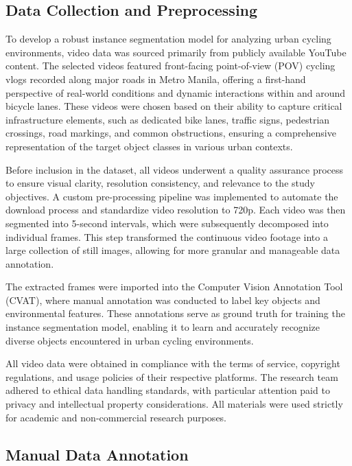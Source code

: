 \subsection{Data Collection and Preprocessing}

To develop a robust instance segmentation model for analyzing urban cycling environments, video data was sourced primarily from publicly available YouTube content. The selected videos featured front-facing point-of-view (POV) cycling vlogs recorded along major roads in Metro Manila, offering a first-hand perspective of real-world conditions and dynamic interactions within and around bicycle lanes. These videos were chosen based on their ability to capture critical infrastructure elements, such as dedicated bike lanes, traffic signs, pedestrian crossings, road markings, and common obstructions, ensuring a comprehensive representation of the target object classes in various urban contexts.

Before inclusion in the dataset, all videos underwent a quality assurance process to ensure visual clarity, resolution consistency, and relevance to the study objectives. A custom pre-processing pipeline was implemented to automate the download process and standardize video resolution to 720p. Each video was then segmented into 5-second intervals, which were subsequently decomposed into individual frames. This step transformed the continuous video footage into a large collection of still images, allowing for more granular and manageable data annotation.

The extracted frames were imported into the Computer Vision Annotation Tool (CVAT), where manual annotation was conducted to label key objects and environmental features. These annotations serve as ground truth for training the instance segmentation model, enabling it to learn and accurately recognize diverse objects encountered in urban cycling environments.

All video data were obtained in compliance with the terms of service, copyright regulations, and usage policies of their respective platforms. The research team adhered to ethical data handling standards, with particular attention paid to privacy and intellectual property considerations. All materials were used strictly for academic and non-commercial research purposes.

\subsection{Manual Data Annotation}


